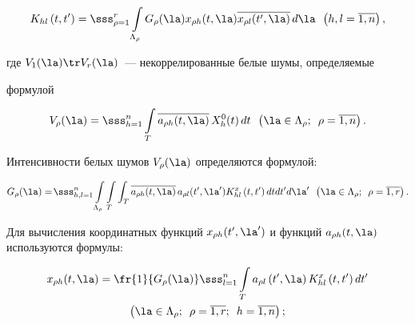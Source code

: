 \vspace*{-9pt}



\noindent

\begin{equation}

K_{hl}\left(t, t'\right) =\sss_{\rho =1}^r \int\limits_{\Lambda_\rho} G_\rho (\la) x_{\rho h} (t,\la)\overline{x_{\rho l} (t',\la)}\, d\la\enskip 

\left(h,l=\overline{1,n}\right),\label{e2.17-s}

\end{equation}

где $V_1(\la)\tr V_r(\la)$~--- некоррелированные белые шумы, определяемые 

фор\-мулой

\begin{equation*}

V_\rho (\la) = \sss_{h=1}^n  \int\limits_{T} \overline{a_{\rho h} (t,\la)}\, X_h^0 

(t) \,dt\enskip \left(\la\in \Lambda_\rho; \enskip \rho=\overline{1,n}\right).


\end{equation*}



Интенсивности белых шумов $V_\rho (\la)$ определяются формулой:

    \begin{equation*}

    G_\rho (\la) = \!\sss_{h,l=1}^n   \int\limits_{\Lambda_\rho}\int\limits_{T}\int_T 

\overline{a_{\rho h} (t,\la)}\,a_{\rho l}(t',\la') K_{hl}^x \left(t,t'\right) dt 

dt'd\la'\enskip \left(\la\in \Lambda_\rho; \enskip \rho=\overline{1,r}\right).


\end{equation*}

Для вычисления координатных функций $x_{\rho h} (t',\la')$ и функций $a_{\rho h} 

(t,\la)$ используются формулы:

   \begin{multline}

   x_{\rho h} (t,\la) =\fr{1}{G_\rho (\la)} \sss_{l=1}^n \int\limits_T a_{\rho l} 

\left(t',\la\right)K_{hl}^x \left(t,t'\right)dt'\\

\left(\la\in \Lambda_\rho; \enskip 

\rho=\overline{1,r};\enskip h=\overline{1,n}\right);

\label{e2.20-s}

\end{multline}



